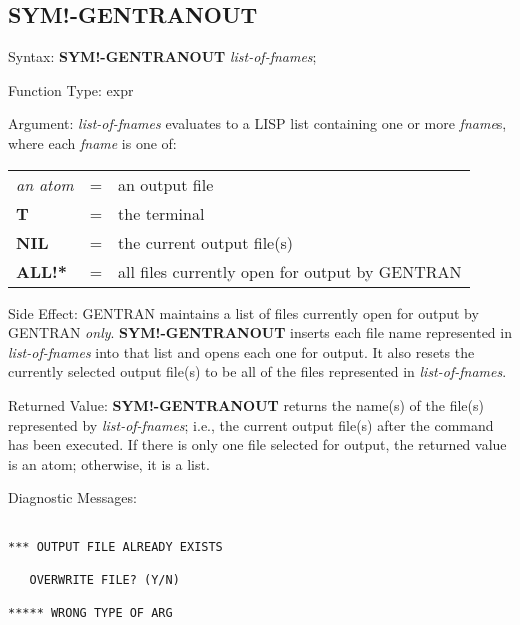 \subsection{SYM!-GENTRANOUT}
\begin{describe}{Syntax:}
{\bf SYM!-GENTRANOUT} {\it list-of-fnames\/};
\end{describe} 
\begin{describe}{Function Type:}
expr
\end{describe} 
\begin{describe}{Argument:}
{\it list-of-fnames\/} evaluates to a LISP list containing one or more
{\it fname\/}s, where each {\it fname} is one of:

\begin{tabular}{lll}
{\it an atom} & = & an output file\\
{\bf T} & = & the terminal\\
{\bf NIL} & = &  the current output file(s)\\
{\bf ALL!*} & = &  all files currently open for output by GENTRAN\\
\end{tabular}
\end{describe}
\begin{describe}{Side Effect:}
GENTRAN maintains a list of files currently open for output by GENTRAN
{\it only}.  {\bf SYM!-GENTRANOUT} inserts each file name represented in
{\it list-of-fnames\/} into that list and opens each one
for output.  It also resets the currently selected output file(s) to be
all of the files represented in {\it list-of-fnames}.
\end{describe} 
\begin{describe}{Returned Value:}
{\bf SYM!-GENTRANOUT} returns the name(s) of the file(s) represented
by {\it list-of-fnames\/}; i.e., the current output file(s) after the
command has been executed.  If there is only one file
selected for output, the returned value is an atom; otherwise, it is
a list.
\end{describe} 
\begin{describe}{Diagnostic Messages:}
\begin{verbatim}

*** OUTPUT FILE ALREADY EXISTS

   OVERWRITE FILE? (Y/N)

***** WRONG TYPE OF ARG
\end{verbatim}
\end{describe} 

